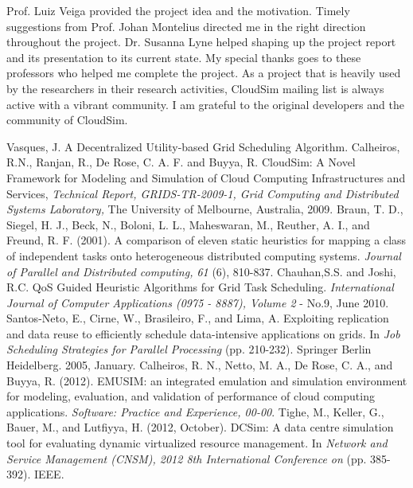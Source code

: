 \documentclass[times, 10pt,twocolumn]{article}
\begin{document}
Prof. Luiz Veiga provided the project idea and the motivation. Timely suggestions from Prof. Johan Montelius directed me in the right direction throughout the project. Dr. Susanna Lyne helped shaping up the project report and its presentation to its current state. My special thanks goes to these professors who helped me complete the project. As a project that is heavily used by the researchers in their research activities, CloudSim mailing list is always active with a vibrant community. I am grateful to the original developers and the community of CloudSim.

\begin{thebibliography}{1}

 Vasques, J. A Decentralized Utility-based Grid Scheduling Algorithm.
 Calheiros, R.N., Ranjan, R., De Rose, C. A. F. and Buyya, R. CloudSim: A Novel Framework for Modeling and
 Simulation of Cloud Computing Infrastructures and Services, {\em Technical Report, GRIDS-TR-2009-1, Grid
 Computing and Distributed Systems Laboratory,} The University of Melbourne, Australia, 2009.
 Braun, T. D., Siegel, H. J., Beck, N., Boloni, L. L., Maheswaran, M., Reuther, A. I., and Freund, R. F. (2001). A comparison of eleven static heuristics for mapping a class of independent tasks onto heterogeneous distributed computing systems. {\em Journal of Parallel and Distributed computing, 61} (6), 810-837.
 Chauhan,S.S. and Joshi, R.C. QoS Guided Heuristic Algorithms for Grid Task Scheduling. {\em International Journal of Computer Applications (0975 - 8887), Volume 2} - No.9, June 2010.
 Santos-Neto, E., Cirne, W., Brasileiro, F., and Lima, A. Exploiting replication and data reuse to efficiently schedule data-intensive applications on grids. In {\em Job Scheduling Strategies for Parallel Processing} (pp. 210-232). Springer Berlin Heidelberg. 2005, January.
 Calheiros, R. N., Netto, M. A., De Rose, C. A., and Buyya, R. (2012). EMUSIM: an integrated emulation and simulation environment for modeling, evaluation, and validation of performance of cloud computing applications. {\em Software: Practice and Experience, 00-00}.
 Tighe, M., Keller, G., Bauer, M., and Lutfiyya, H. (2012, October). DCSim: A data centre simulation tool for evaluating dynamic virtualized resource management. In {\em Network and Service Management (CNSM), 2012 8th International Conference on} (pp. 385-392). IEEE.

\end{thebibliography}
\end{document}
